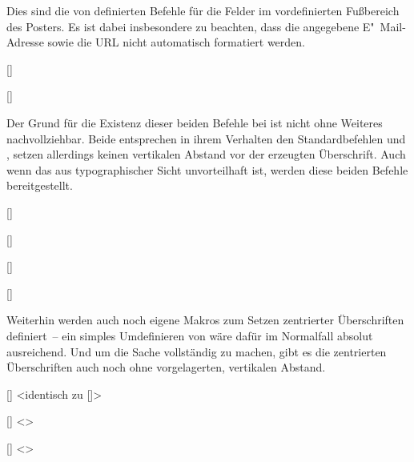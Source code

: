 \begin{DeclareEntity}{}
\begin{Declaration}
\begin{Declaration}
\begin{Declaration}
\begin{Declaration}
Dies sind die von  definierten Befehle für die Felder im 
vordefinierten Fußbereich des Posters. Es ist dabei insbesondere zu beachten, 
dass die angegebene E"~Mail-Adresse sowie die URL nicht automatisch formatiert 
werden.
\end{Declaration}
\end{Declaration}
\end{Declaration}
\end{Declaration}

\begin{Declaration}
  {[]}
\begin{Declaration}
  {[]}
\printdeclarationlist

Der Grund für die Existenz dieser beiden Befehle bei  ist 
nicht ohne Weiteres nachvollziehbar. Beide entsprechen in ihrem Verhalten den 
Standardbefehlen  und , setzen allerdings 
keinen vertikalen Abstand vor der erzeugten Überschrift. Auch wenn das aus 
typographischer Sicht unvorteilhaft ist, werden diese beiden Befehle 
bereitgestellt.
\end{Declaration}
\end{Declaration}

\begin{Declaration}
  {[]}
\begin{Declaration}
  {[]}
\begin{Declaration}
  {[]}
\begin{Declaration}
  {[]}
\printdeclarationlist

Weiterhin werden auch noch eigene Makros zum Setzen zentrierter Überschriften 
definiert~-- ein simples Umdefinieren von  wäre dafür im 
Normalfall absolut ausreichend. Und um die Sache vollständig zu machen, gibt es 
die zentrierten Überschriften auch noch ohne vorgelagerten, vertikalen Abstand.
\end{Declaration}
\end{Declaration}
\end{Declaration}
\end{Declaration}

\begin{Declaration}
  {[]}
  <identisch zu []>
\begin{Declaration}
  {[]}
  <>
\begin{Declaration}
  {[]}
  <>
\printdeclarationlist


\end{Declaration}
\end{Declaration}
\end{Declaration}
\end{DeclareEntity}
